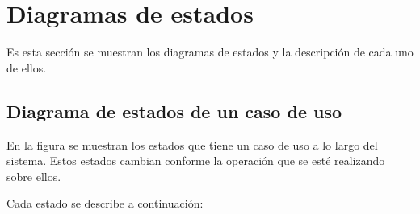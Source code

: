 \section{Diagramas de estados}
Es esta sección se muestran los diagramas de estados y la descripción de cada uno de ellos.\\

\subsection{Diagrama de estados de un caso de uso}

En la figura  se muestran los estados que tiene un caso de uso a lo largo 
del sistema. Estos estados cambian conforme la operación que se esté realizando sobre ellos.\\


Cada estado se describe a continuación:


